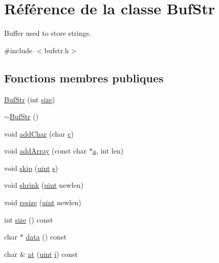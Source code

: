 \hypertarget{class_buf_str}{}\section{Référence de la classe Buf\+Str}
\label{class_buf_str}


Buffer used to store strings.  




{\ttfamily \#include $<$bufstr.\+h$>$}

\subsection*{Fonctions membres publiques}
\begin{DoxyCompactItemize}
\item 
\hyperlink{class_buf_str_ad752ce74eb8d9ca7d546836f09ba448b}{Buf\+Str} (int \hyperlink{class_buf_str_a4554519665ffeb764a8edbaf4f10d92c}{size})
\item 
\hyperlink{class_buf_str_aceb0e03981b7c20ee59616b2ecde261a}{$\sim$\+Buf\+Str} ()
\item 
void \hyperlink{class_buf_str_a36ec062edea86b33b794eeab37f32b1c}{add\+Char} (char \hyperlink{060__command__switch_8tcl_ab14f56bc3bd7680490ece4ad7815465f}{c})
\item 
void \hyperlink{class_buf_str_a81957fec77e64ad1a7c75e2994d903ec}{add\+Array} (const char $\ast$\hyperlink{060__command__switch_8tcl_ab08ae027fc5777bc4f0629f1b60b35db}{a}, int len)
\item 
void \hyperlink{class_buf_str_a9cc2457c5bf9f46db797dbf5c86f7be2}{skip} (\hyperlink{qglobal_8h_a4d3943ddea65db7163a58e6c7e8df95a}{uint} \hyperlink{060__command__switch_8tcl_a011c73f2dbb87635a3b4206c72355f6e}{s})
\item 
void \hyperlink{class_buf_str_a11fc0e89dd066db9395751269c6a761f}{shrink} (\hyperlink{qglobal_8h_a4d3943ddea65db7163a58e6c7e8df95a}{uint} newlen)
\item 
void \hyperlink{class_buf_str_af87ab9881190162554a0ace539be4b75}{resize} (\hyperlink{qglobal_8h_a4d3943ddea65db7163a58e6c7e8df95a}{uint} newlen)
\item 
int \hyperlink{class_buf_str_a4554519665ffeb764a8edbaf4f10d92c}{size} () const 
\item 
char $\ast$ \hyperlink{class_buf_str_a366417fab189ed2b6a2c6a834623d51d}{data} () const 
\item 
char \& \hyperlink{class_buf_str_a6bfff13e0f1a32c7183d0515df4ff2fe}{at} (\hyperlink{qglobal_8h_a4d3943ddea65db7163a58e6c7e8df95a}{uint} \hyperlink{060__command__switch_8tcl_a8c90afd4641b25be86bd09983c3cbee0}{i}) const 

\end{DoxyCompactItemize}
